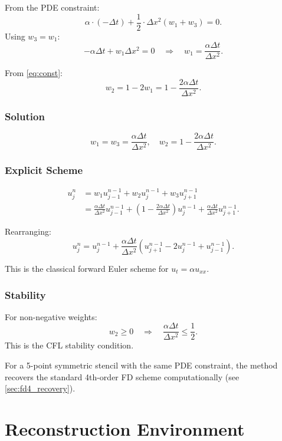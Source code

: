 \documentclass[12pt, a4paper, twoside]{report}
\theoremstyle{plain}
\theoremstyle{definition}
\begin{document}
From the PDE constraint:
\[
\alpha \cdot (-\Delta t) + \frac{1}{2} \cdot \Delta x^2(w_1 + w_3) = 0.
\]
Using $w_3 = w_1$:
\[
-\alpha \Delta t + w_1 \Delta x^2 = 0 \quad \Rightarrow \quad w_1 = \frac{\alpha \Delta t}{\Delta x^2}.
\]

From \eqref{eq:const}:
\[
w_2 = 1 - 2w_1 = 1 - \frac{2\alpha \Delta t}{\Delta x^2}.
\]

\subsection*{Solution}
\[
\boxed{
w_1 = w_3 = \frac{\alpha \Delta t}{\Delta x^2}, \quad
w_2 = 1 - \frac{2\alpha \Delta t}{\Delta x^2}.
}
\]

\subsection*{Explicit Scheme}
\begin{align*}
u_j^n &= w_1 u_{j-1}^{n-1} + w_2 u_j^{n-1} + w_3 u_{j+1}^{n-1} \\
&= \frac{\alpha \Delta t}{\Delta x^2} u_{j-1}^{n-1} + \left(1 - \frac{2\alpha \Delta t}{\Delta x^2}\right) u_j^{n-1} + \frac{\alpha \Delta t}{\Delta x^2} u_{j+1}^{n-1}.
\end{align*}

Rearranging:
\begin{equation}
\boxed{
u_j^n = u_j^{n-1} + \frac{\alpha \Delta t}{\Delta x^2} (u_{j+1}^{n-1} - 2u_j^{n-1} + u_{j-1}^{n-1}).
} \label{eq: fDStencil}
\end{equation}


This is the classical forward Euler scheme for $u_t = \alpha u_{xx}$.

\subsection*{Stability}
For non-negative weights:
\[
w_2 \geq 0 \quad \Rightarrow \quad \boxed{\frac{\alpha \Delta t}{\Delta x^2} \leq \frac{1}{2}.}
\]
This is the CFL stability condition.

For a 5-point symmetric stencil with the same PDE constraint, the
method recovers the standard 4th-order FD scheme computationally (see
\cref{sec:fd4_recovery}).

\chapter{Reconstruction Environment}
\label{chap:reconstruction}
\end{document}
